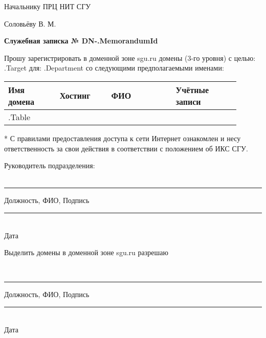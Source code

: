 \documentclass[12pt]{article}
\begin{document}
\begin{flushright}
Начальнику ПРЦ НИТ СГУ

Соловьёву В. М. \\[50pt]
\end{flushright}

\begin{center}
\large
\textbf{Служебная записка № DN-{{.MemorandumId}} } \\[20pt]
\end{center}
\begin{flushleft}
\large
Прошу зарегистрировать в доменной зоне sgu.ru домены (3-го уровня) с целью: {{.Target}} для: {{.Department}} со следующими предполагаемыми именами:
\end{flushleft}




\begin{table}[!h]
\large
\centering
\label{my-label}
\begin{tabular}{|p{0.20\linewidth}|p{0.20\linewidth}|p{0.25\linewidth}|p{0.25\linewidth}|}
\hline
Имя домена & Хостинг & ФИО & Учётные записи \\
\hline
{{.Table}}
\end{tabular}
\end{table}


\small
* С правилами предоставления доступа к сети Интернет ознакомлен и несу ответственность за свои действия в соответствии с положением об ИКС СГУ. \\[30pt]
\normalsize
\begin{flushleft}
\large
Руководитель подразделения:\\~\\
\end{flushleft}
\centering
\noindent\rule{550pt}{0.4pt}
\large
Должность, ФИО, Подпись\\[50pt]

\begin{flushright}
\normalsize
\noindent\rule{100pt}{0.4pt} \\
Дата           
\end{flushright}

\begin{flushleft}
Выделить домены в доменной зоне sgu.ru разрешаю
\end{flushleft}
 
\\

\centering
\noindent\rule{550pt}{0.4pt}
\large
Должность, ФИО, Подпись\\[50pt]

\begin{flushright}
\normalsize
\noindent\rule{100pt}{0.4pt} \\
Дата           
\end{flushright}
\end{document}
